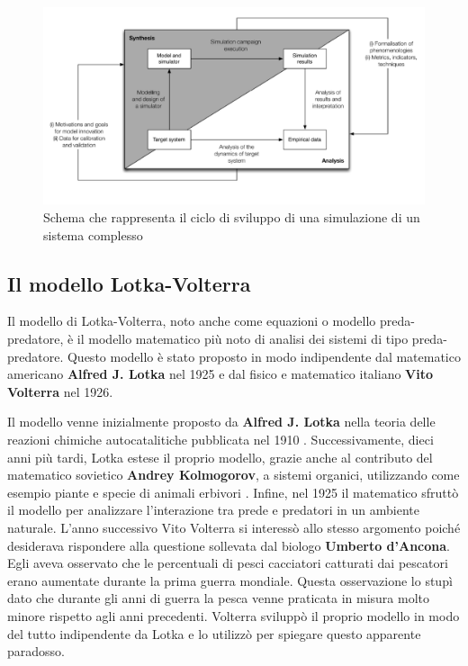 \documentclass[11pt]{article}
\begin{document}
\begin{figure}
    \centering
    \includegraphics[scale = 0.6]{cicloSviluppoSimulazione.png}
    \caption{Schema che rappresenta il ciclo di sviluppo di una simulazione di un sistema complesso}
    \label{figCicloSviluppo}
\end{figure}

\subsection{Il modello Lotka-Volterra}
\label{sec:LV}
Il modello di Lotka-Volterra, noto anche come equazioni o modello preda-predatore, è il modello matematico più noto di analisi dei sistemi di tipo preda-predatore. Questo modello è stato proposto in modo indipendente dal matematico americano \textbf{Alfred J. Lotka} nel 1925 e dal fisico e matematico italiano \textbf{Vito Volterra} nel 1926. 

Il modello venne inizialmente proposto da \textbf{Alfred J. Lotka} nella teoria delle reazioni chimiche autocatalitiche pubblicata nel 1910 \cite{Goel}. Successivamente, dieci anni più tardi, Lotka estese il proprio modello, grazie anche al contributo del matematico sovietico \textbf{Andrey Kolmogorov}, a sistemi organici, utilizzando come esempio piante e specie di animali erbivori \cite{Lotka1920}. Infine, nel 1925 il matematico sfruttò il modello per analizzare l'interazione tra prede e predatori in un ambiente naturale\cite{Lotka1925}. L'anno successivo Vito Volterra si interessò allo stesso argomento poiché desiderava rispondere alla questione sollevata dal biologo \textbf{Umberto d'Ancona}\cite{Bacaer}. Egli aveva osservato che le percentuali di pesci cacciatori catturati dai pescatori erano aumentate durante la prima guerra mondiale. Questa osservazione lo stupì dato che durante gli anni di guerra la pesca venne praticata in misura molto minore rispetto agli anni precedenti. Volterra sviluppò il proprio modello in modo del tutto indipendente da Lotka e lo utilizzò per spiegare questo apparente paradosso. 
\end{document}
